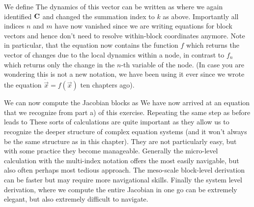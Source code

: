 \solution 
We define 
The dynamics of this vector can be written as 
where we again identified $\bf C$ and changed the summation index to $k$ as above. Importantly all indices $n$ and $m$ have now vanished since we are writing equations for block vectors and hence don't need to resolve within-block coordinates anymore. Note in particular, that the equation now contains the function $f$ which returns the vector of changes due to the local dynamics within a node, in contrast to $f_n$ which returns only the change in the $n$-th variable of the node. (In case you are wondering this is not a new notation, we have been using it ever since we wrote the equation $\dot{\vec{x}}=f(\vec{x})$ ten chapters ago). 

We can now compute the Jacobian blocks as 
We have now arrived at an equation that we recognize from part a) of this exercise. Repeating the same step as before leads to
These sorts of calculations are quite important as they allow us to recognize the deeper structure of complex equation systems (and it won't always be the same structure as in this chapter). They are not particularly easy, but with some practice they become manageable. Generally the micro-level calculation with the multi-index notation offers the most easily navigable, but also often perhaps most tedious approach. The meso-scale block-level derivation can be faster but may require more navigational skills. Finally the system level derivation, where we compute the entire Jacobian in one go can be extremely elegant, but also extremely difficult to navigate.  
